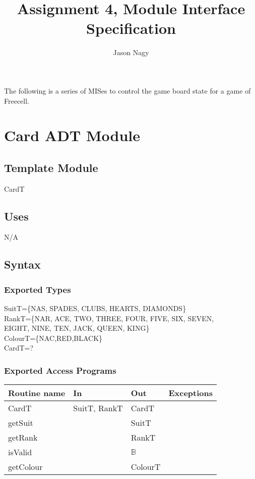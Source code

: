 \documentclass[12pt]{article}
\title{Assignment 4, Module Interface Specification}
\author{Jason Nagy}
\begin{document}
\maketitle

The following is a series of MISes to control the game board state for a
game of Freecell.

\newpage

\section*{Card ADT Module}

\subsection*{Template Module}

CardT

\subsection*{Uses}

N/A

\subsection*{Syntax}

\subsubsection*{Exported Types}

SuitT=\{NAS, SPADES, CLUBS, HEARTS, DIAMONDS\}\\
RankT=\{NAR, ACE, TWO, THREE, FOUR, FIVE, SIX, SEVEN, \\
EIGHT, NINE, TEN, JACK, QUEEN, KING\}\\
ColourT=\{NAC,RED,BLACK\}\\
CardT=?\\

\subsubsection*{Exported Access Programs}

\begin{tabular}{| l | l | l | l |}
\hline
\textbf{Routine name} & \textbf{In} & \textbf{Out} & \textbf{Exceptions}\\
\hline
CardT & SuitT, RankT & CardT & ~\\
\hline
getSuit & ~ & SuitT & ~\\
\hline
getRank & ~ & RankT & ~\\
\hline
isValid & ~ & $\mathbb{B}$ & ~\\
\hline
getColour & ~ & ColourT & ~\\
\hline
\end{tabular}
\end{document}
